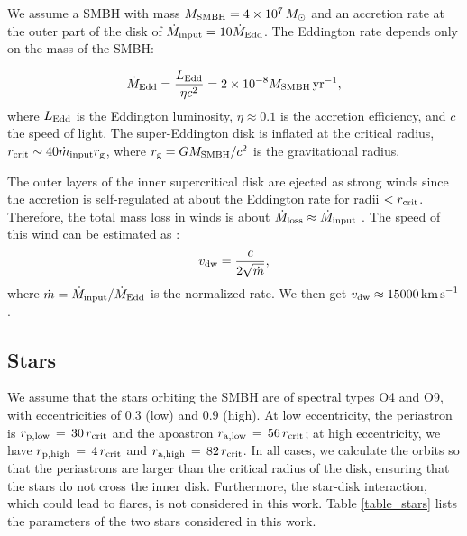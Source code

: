 \documentclass[baaa]{baaa}
\begin{document}


We assume a SMBH with mass $M_{\text{\rm SMBH}}=4 \times 10^7 \, M_\odot$ and an accretion rate at the outer part of the disk of $\dot{M}_{\text{\rm input}} = 10 \dot{M}_{\text{\rm Edd}}$. The Eddington rate depends only on the mass of the SMBH:
 
\begin{equation}
\dot{M}_{\text{\rm Edd}} = \frac{L_{\text{\rm Edd}}}{\eta c^2} = 2 \times 10^{-8} M_{\text {\rm SMBH}} \, \rm {yr^{-1}},
\end{equation}
where $L_{\text{\rm Edd}}$ is the Eddington luminosity, $\eta \approx 0.1$ is the accretion efficiency, and $c$ the speed of light. The super-Eddington disk is inflated at the critical radius, $r_{\text{crit}} \sim 40 \dot{m}_{\text{input}} r_{\rm g}$, where \( r_{\rm g} = {G M_{\text {\rm SMBH}}}/{c^2} \) is the gravitational radius.


The outer layers of the inner supercritical disk are ejected as strong winds since the accretion is self-regulated at about the Eddington rate for radii $<r_{\text {\rm crit}}$. Therefore, the total mass loss in winds is about \(\dot{M}_{\text{\rm loss}} \approx \dot{M}_{\text{\rm input}}\) \citep{2024A&A...691A..93A}. The speed of this wind can be estimated as \citep{2010MNRAS.402.1516K}:
\begin{equation}
v_{\text{\rm dw}} = \frac{c}{2 \sqrt{\dot{m}}},
\end{equation}
where $\dot{m} = \dot{M}_{\rm input}/\dot{M}_{\rm Edd}$ is the normalized rate. We then get $v_{\text{\rm dw}}\approx 15000 \, \text{km\,s}^{-1}$.

\subsection{Stars}


We assume that the stars orbiting the SMBH are of spectral types O4 and O9, with eccentricities of 0.3 (low) and 0.9 (high). At low eccentricity, the periastron is $r_{\rm{p,low}} \, = \, 30 \, r_{\rm{crit}}$ and the apoastron $r_{\rm{a,low}} \, = \, 56 \, r_{\rm{crit}}$; at high eccentricity, we have $r_{\rm{p,high}} \, = \, 4 \, r_{\rm{crit}}$ and $r_{\rm{a,high}} \, = \, 82 \, r_{\rm{crit}}$.  In all cases, we calculate the orbits so that the periastrons are larger than the critical radius of the disk, ensuring that the stars do not cross the inner disk. Furthermore, the star-disk interaction, which could lead to flares, is not considered in this work. Table \ref{table_stars} lists the parameters of the two stars considered in this work.
\end{document}
